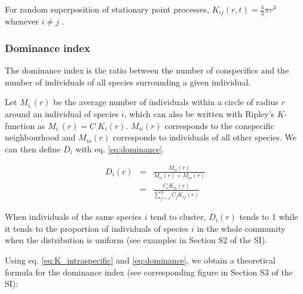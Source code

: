 \documentclass[english]{article}
\begin{document}
For random superposition of stationary point processes, $K_{ij}(r,t)=\frac{4}{3}\pi r^{3}$
whenever $i\neq j$ \citep[p. 324, eq. 5.3.5]{illian2008statistical}.

\subsubsection*{Dominance index}

The dominance index \citep[defined in Table S1 in the Supporting Information of][]{wiegand_how_2007}
is the ratio between the number of conspecifics and the number of
individuals of all species surrounding a given individual.

 Let $M_{i.}(r)$ be the average number of individuals within a circle
of radius $r$ around an individual of species $i$, which can also
be written with Ripley's $K$-function as $M_{i.}(r)=C_{.}K_{i}(r)$.
$M_{ii}(r)$ corresponds to the conspecific neighbourhood and $M_{io}(r)$
corresponds to individuals of all other species. We can then define
$D_{i}$ with eq. \ref{eq:dominance}.

\begin{doublespace}
\begin{equation}
\begin{array}{ccc}
D_{i}(r) & = & \frac{M_{ii}(r)}{M_{ii}(r)+M_{io}(r)}\\
 & = & \frac{C_{i}K_{ii}(r)}{\sum_{j=1}^{S}C_{j}K_{ij}(r)}
\end{array}\label{eq:dominance}
\end{equation}

\end{doublespace}

When individuals of the same species $i$ tend to cluster, $D_{i}(r)$
tends to 1 while it tends to the proportion of individuals of species
$i$ in the whole community when the distribution is uniform (see
examples in Section S2 of the SI).

Using eq. \ref{eq:K_intraspecific} and \ref{eq:dominance}, we obtain
a theoretical formula for the dominance index (see corresponding figure
in Section S3 of the SI):
\end{document}
